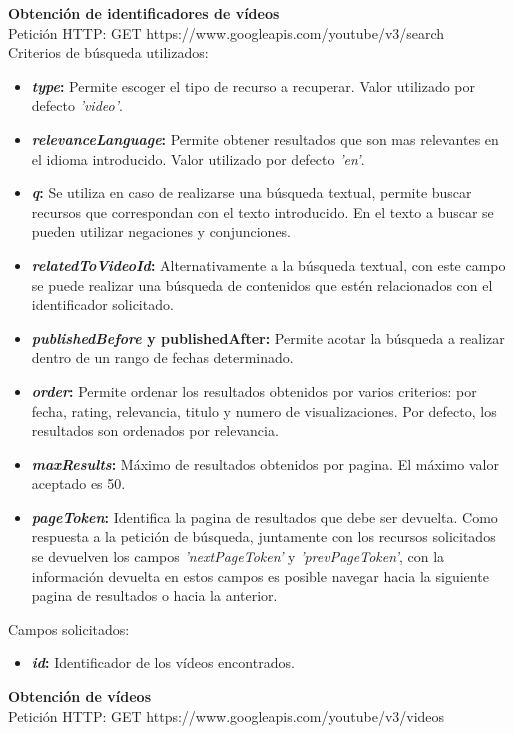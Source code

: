 \documentclass[11pt,a4paper]{article}
\begin{document}
\noindent\textbf{Obtención de identificadores de vídeos}\\
Petición HTTP: GET https://www.googleapis.com/youtube/v3/search\\

Criterios de búsqueda utilizados:
\begin{itemize}
\item \textbf{\textit{type}:} Permite escoger el tipo de recurso a recuperar. Valor utilizado por defecto \textit{'video'}.
\item \textbf{\textit{relevanceLanguage}:} Permite obtener resultados que son mas relevantes en el idioma introducido. Valor utilizado por defecto \textit{'en'}.
\item \textbf{\textit{q}:} Se utiliza en caso de realizarse una búsqueda textual, permite buscar recursos que correspondan con el texto introducido. En el texto a buscar se pueden utilizar negaciones y conjunciones.
\item \textbf{\textit{relatedToVideoId}:} Alternativamente a la búsqueda textual, con este campo se puede realizar una búsqueda de contenidos que estén relacionados con el identificador solicitado.
\item \textbf{\textit{publishedBefore} y publishedAfter:} Permite acotar la búsqueda a realizar dentro de un rango de fechas determinado. 
\item \textbf{\textit{order}:} Permite ordenar los resultados obtenidos por varios criterios: por fecha, rating, relevancia, titulo y numero de visualizaciones. Por defecto, los resultados son ordenados por relevancia.
\item \textbf{\textit{maxResults}:} Máximo de resultados obtenidos por pagina. El máximo valor aceptado es 50.
\item \textbf{\textit{pageToken}:} Identifica la pagina de resultados que debe ser devuelta. Como respuesta a la petición de búsqueda, juntamente con los recursos solicitados se devuelven los campos \textit{'nextPageToken'} y \textit{'prevPageToken'}, con la información devuelta en estos campos es posible navegar hacia la siguiente pagina de resultados o hacia la anterior.
\end{itemize}

Campos solicitados:
\begin{itemize}
\item \textbf{\textit{id}:} Identificador de los vídeos encontrados.
\end{itemize}
\medskip 

\noindent\textbf{Obtención de vídeos}\\
Petición HTTP: GET https://www.googleapis.com/youtube/v3/videos\\
\end{document}
